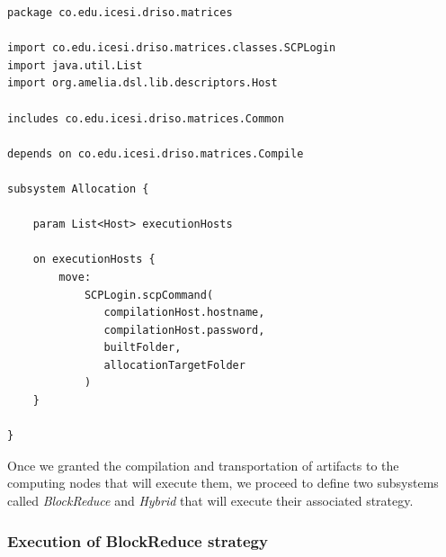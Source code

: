 \documentclass{article}
\begin{document}
\begin{lstlisting}[style=amelia,caption=Subsystem for artifacts allocation to computing nodes.]
package co.edu.icesi.driso.matrices

import co.edu.icesi.driso.matrices.classes.SCPLogin
import java.util.List
import org.amelia.dsl.lib.descriptors.Host

includes co.edu.icesi.driso.matrices.Common

depends on co.edu.icesi.driso.matrices.Compile

subsystem Allocation {

	param List<Host> executionHosts

	on executionHosts {
		move:
			SCPLogin.scpCommand(
	           compilationHost.hostname,
	           compilationHost.password,
	           builtFolder,
	           allocationTargetFolder
			)
	}
	
}
\end{lstlisting}

Once we granted the compilation and transportation of artifacts to the computing nodes that will execute them, we proceed to define two subsystems called \textit{BlockReduce} and \textit{Hybrid} that will execute their associated strategy. \\

\subsubsection{Execution of BlockReduce strategy}
\end{document}
